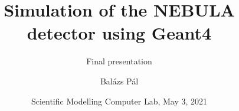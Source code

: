 \title[Geant4]
{Simulation of the NEBULA detector using Geant4}

\subtitle{Final presentation}

\author[Balázs Pál]
{Balázs Pál}


\date[ELTE 2021]
{Scientific Modelling Computer Lab, May 3, 2021}

